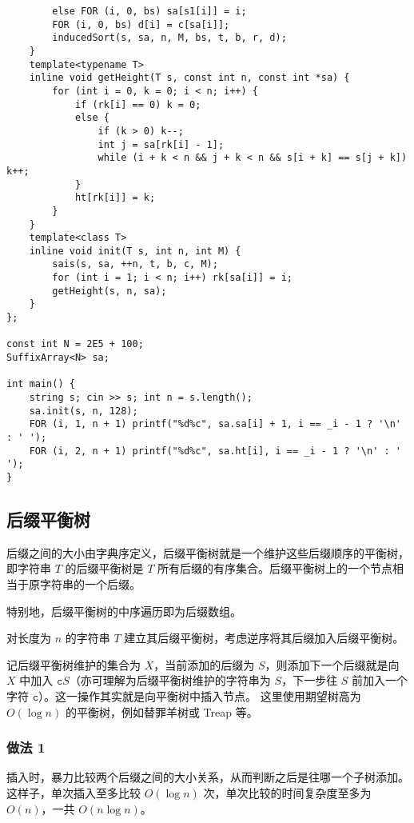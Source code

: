 \documentclass[]{article}
\begin{document}
\begin{verbatim}
        else FOR (i, 0, bs) sa[s1[i]] = i;
        FOR (i, 0, bs) d[i] = c[sa[i]];
        inducedSort(s, sa, n, M, bs, t, b, r, d);
    }
    template<typename T>
    inline void getHeight(T s, const int n, const int *sa) {
        for (int i = 0, k = 0; i < n; i++) {
            if (rk[i] == 0) k = 0;
            else {
                if (k > 0) k--;
                int j = sa[rk[i] - 1];
                while (i + k < n && j + k < n && s[i + k] == s[j + k]) k++;
            }
            ht[rk[i]] = k;
        }
    }
    template<class T>
    inline void init(T s, int n, int M) {
        sais(s, sa, ++n, t, b, c, M);
        for (int i = 1; i < n; i++) rk[sa[i]] = i;
        getHeight(s, n, sa);
    }
};

const int N = 2E5 + 100;
SuffixArray<N> sa;

int main() {
    string s; cin >> s; int n = s.length();
    sa.init(s, n, 128);
    FOR (i, 1, n + 1) printf("%d%c", sa.sa[i] + 1, i == _i - 1 ? '\n' : ' ');
    FOR (i, 2, n + 1) printf("%d%c", sa.ht[i], i == _i - 1 ? '\n' : ' ');
}
\end{verbatim}

\hypertarget{ux540eux7f00ux5e73ux8861ux6811}{%
\subsection{后缀平衡树}\label{ux540eux7f00ux5e73ux8861ux6811}}

后缀之间的大小由字典序定义，后缀平衡树就是一个维护这些后缀顺序的平衡树，即字符串
\(T\) 的后缀平衡树是 \(T\)
所有后缀的有序集合。后缀平衡树上的一个节点相当于原字符串的一个后缀。

特别地，后缀平衡树的中序遍历即为后缀数组。

对长度为 \(n\) 的字符串 \(T\)
建立其后缀平衡树，考虑逆序将其后缀加入后缀平衡树。

记后缀平衡树维护的集合为 \(X\)，当前添加的后缀为
\(S\)，则添加下一个后缀就是向 \(X\) 中加入
\(\texttt{c}S\)（亦可理解为后缀平衡树维护的字符串为 \(S\)，下一步往
\(S\) 前加入一个字符
\(\texttt{c}\)）。这一操作其实就是向平衡树中插入节点。
这里使用期望树高为 \(O(\log n)\) 的平衡树，例如替罪羊树或 Treap 等。

\hypertarget{ux505aux6cd5-1}{%
\subsubsection{做法 1}\label{ux505aux6cd5-1}}

插入时，暴力比较两个后缀之间的大小关系，从而判断之后是往哪一个子树添加。这样子，单次插入至多比较
\(O(\log n)\) 次，单次比较的时间复杂度至多为 \(O(n)\)，一共
\(O(n\log n)\)。
\end{document}
